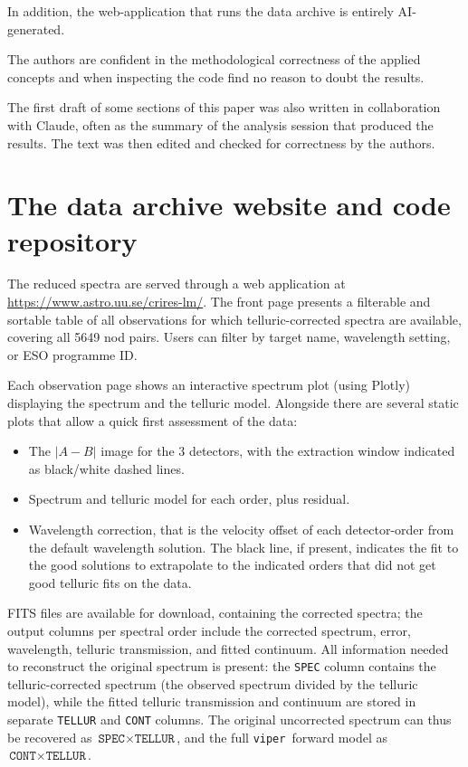 \documentclass{aa}
\newcommand{\viper}{\texttt{viper}}
\begin{document}
In addition, the web-application that runs the data archive is entirely 
AI-generated.

The authors are confident in the methodological correctness of the applied
concepts and when inspecting the code find no reason to doubt
the results.

The first draft of some sections of this paper was also written in collaboration with Claude, often
as the summary of the analysis session that produced the results.
The text was then edited and checked for correctness by the authors.


\section{The data archive website and code repository}
\label{sec:archive}

The reduced spectra are served through a web application at
\url{https://www.astro.uu.se/crires-lm/}. The front page presents a
filterable and sortable table of all observations for which telluric-corrected
spectra are available, covering all 5649 nod pairs. Users can filter by target
name, wavelength setting, or ESO programme ID.

Each observation page shows an interactive spectrum plot (using Plotly)
displaying the spectrum and the telluric model. Alongside there are
several static plots that allow a quick first assessment of the data:
\begin{itemize}
\item The $|A-B|$ image for the 3 detectors, with the extraction window indicated as black/white dashed lines.
\item Spectrum and telluric model for each order, plus residual.
\item Wavelength correction, that is the velocity offset of each detector-order from the default wavelength solution. The black line, if present, indicates the fit to the good solutions to extrapolate to the indicated orders that did not get good telluric fits on the data.
\end{itemize}


FITS files are available for download, containing the corrected spectra;
 the output columns per spectral order include the corrected
spectrum, error, wavelength, telluric transmission, and fitted continuum.
All information needed to reconstruct the
original spectrum is present: the \texttt{SPEC} column contains the telluric-corrected
spectrum (the observed spectrum divided by the telluric model), while the
fitted telluric transmission and continuum are stored in separate
\texttt{TELLUR} and \texttt{CONT} columns. The original uncorrected spectrum
can thus be recovered as $\texttt{SPEC} \times \texttt{TELLUR}$, and the full
\viper\ forward model as $\texttt{CONT} \times \texttt{TELLUR}$.
\end{document}
